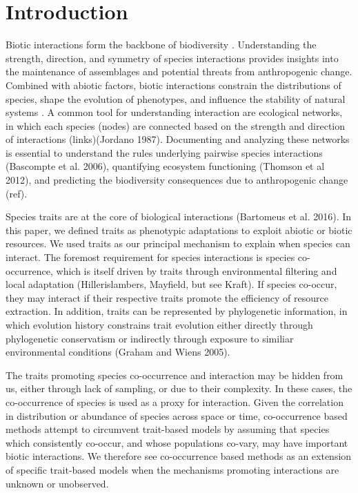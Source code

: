\section{Introduction}\label{introduction}

Biotic interactions form the backbone of biodiversity
\cite{bascompte_plant-animal_2007}. Understanding the strength, direction, and
symmetry of species interactions provides insights into the maintenance of
assemblages and potential threats from anthropogenic change. Combined with
abiotic factors, biotic interactions constrain the distributions of species,
shape the evolution of phenotypes, and influence the stability of natural
systems \cite{schleuning_predicting_2015}. A common tool for understanding
interaction are ecological networks, in which each species (nodes) are connected
based on the strength and direction of interactions (links)(Jordano 1987).
Documenting and analyzing these networks is essential to understand the rules
underlying pairwise species interactions (Bascompte et al. 2006), quantifying
ecosystem functioning (Thomson et al 2012), and predicting the biodiversity
consequences due to anthropogenic change (ref).

Species traits are at the core of biological interactions (Bartomeus et al.
2016). In this paper, we defined traits as phenotypic adaptations to exploit abiotic or
biotic resources. We used traits as our principal mechanism to explain when
species can interact. The foremost requirement for species interactions is
species co-occurrence, which is itself driven by traits through environmental
filtering and local adaptation (Hillerislambers, Mayfield, but see Kraft). If
species co-occur, they may interact if their respective traits promote the
efficiency of resource extraction. In addition, traits can be represented by
phylogenetic information, in which evolution history constrains trait evolution
either directly through phylogenetic conservatism or indirectly through exposure
to similiar environmental conditions (Graham and Wiens 2005).

The traits promoting species co-occurrence and interaction may be hidden from
us, either through lack of sampling, or due to their complexity. In these cases,
the co-occurrence of species is used as a proxy for interaction. Given the
correlation in distribution or abundance of species across space or time,
co-occurrence based methods attempt to circumvent trait-based models by assuming
that species which consistently co-occur, and whose populations co-vary, may
have important biotic interactions. We therefore see co-occurrence based methods
as an extension of specific trait-based models when the mechanisms promoting
interactions are unknown or unobserved.

